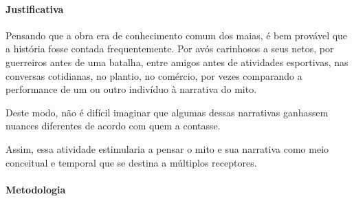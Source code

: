 \documentclass[11pt]{extarticle}
\begin{document}
\paragraph{Justificativa} Pensando que a obra era de conhecimento comum dos maias, é
bem provável que a história fosse contada frequentemente. Por avós
carinhosos a seus netos, por guerreiros antes de uma batalha, entre
amigos antes de atividades esportivas, nas conversas cotidianas, no
plantio, no comércio, por vezes comparando a performance de um ou outro
indivíduo à narrativa do mito.

Deste modo, não é difícil imaginar que algumas dessas narrativas
ganhassem nuances diferentes de acordo com quem a contasse.

Assim, essa atividade estimularia a pensar o mito e sua narrativa como meio conceitual 
e temporal que se destina a múltiplos receptores.

\paragraph{Metodologia} 
\end{document}
